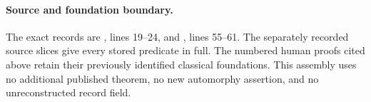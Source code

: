 \paragraph{Source and foundation boundary.}
The exact records are ,
lines 19--24, and
,
lines 55--61.  The separately recorded source slices give every
stored predicate in full.  The numbered human proofs cited above
retain their previously identified classical foundations.  This
assembly uses no additional published theorem, no new automorphy
assertion, and no unreconstructed record field.
